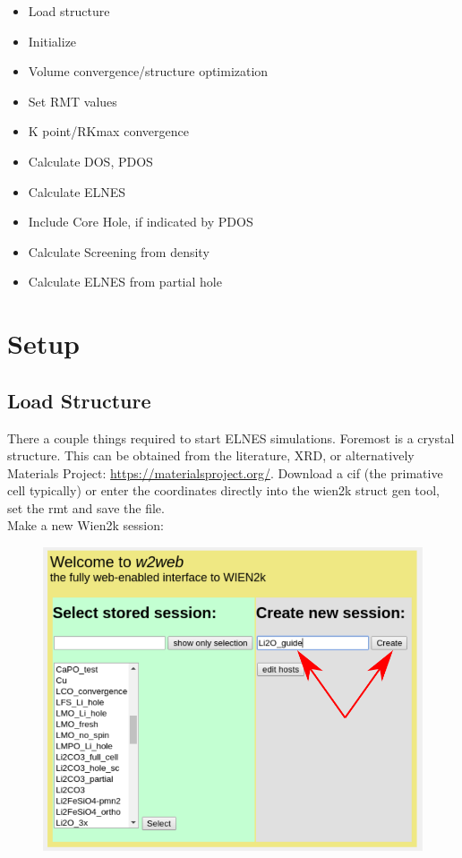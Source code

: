 \documentclass[12pt]{article}
\begin{document}
\begin{itemize}
	\item Load structure
	\item Initialize
	\item Volume convergence/structure optimization
	\item Set RMT values
	\item K point/RKmax convergence
	\item Calculate DOS, PDOS
	\item Calculate ELNES
	\item Include Core Hole, if indicated by PDOS
	\item Calculate Screening from density
	\item Calculate ELNES from partial hole
\end{itemize}


\section{Setup}	

\subsection{Load Structure}
There a couple things required to start ELNES simulations.  Foremost is a crystal structure.  This can be obtained from the literature, XRD, or alternatively Materials Project: \url{https://materialsproject.org/}.  Download a cif (the primative cell typically) or enter the coordinates directly into the wien2k struct gen tool, set the rmt and save the file.  \\

Make a new Wien2k session: 
\begin{figure}[H]
\includegraphics[scale=0.3]{./images/new_session.png}
\end{figure}
\end{document}
